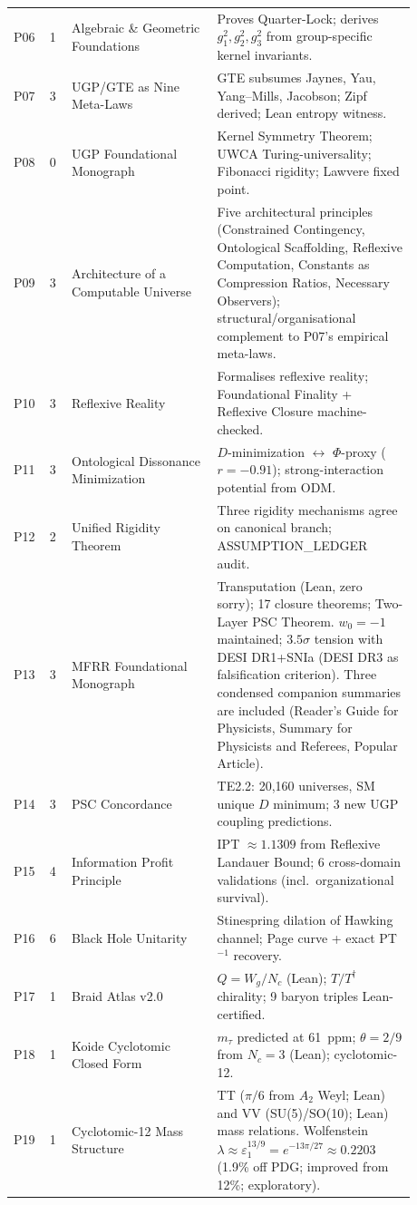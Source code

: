 \documentclass[11pt]{article}
\begin{document}
\begin{longtable}{@{}P{0.05\linewidth}P{0.05\linewidth}P{0.33\linewidth}P{0.45\linewidth}@{}}
P06 & 1 & Algebraic \& Geometric Foundations & Proves Quarter-Lock; derives $g_1^2,g_2^2,g_3^2$ from group-specific kernel invariants. \\
P07 & 3 & UGP/GTE as Nine Meta-Laws & GTE subsumes Jaynes, Yau, Yang--Mills, Jacobson; Zipf derived; Lean entropy witness. \\
P08 & 0 & UGP Foundational Monograph & Kernel Symmetry Theorem; UWCA Turing-universality; Fibonacci rigidity; Lawvere fixed point. \\
P09 & 3 & Architecture of a Computable Universe & Five architectural principles (Constrained Contingency, Ontological Scaffolding, Reflexive Computation, Constants as Compression Ratios, Necessary Observers); structural/organisational complement to P07's empirical meta-laws. \\
P10 & 3 & Reflexive Reality & Formalises reflexive reality; Foundational Finality + Reflexive Closure machine-checked. \\
P11 & 3 & Ontological Dissonance Minimization & $D$-minimization $\leftrightarrow$ $\Phi$-proxy ($r=-0.91$); strong-interaction potential from ODM. \\
P12 & 2 & Unified Rigidity Theorem & Three rigidity mechanisms agree on canonical branch; ASSUMPTION\_LEDGER audit. \\
P13 & 3 & MFRR Foundational Monograph & Transputation (Lean, zero sorry); 17 closure theorems; Two-Layer PSC Theorem.  $w_0 = -1$ maintained; $3.5\sigma$ tension with DESI DR1+SNIa (DESI DR3 as falsification criterion).  Three condensed companion summaries are included (Reader's Guide for Physicists, Summary for Physicists and Referees, Popular Article). \\
P14 & 3 & PSC Concordance & TE2.2: 20,160 universes, SM unique $D$ minimum; 3 new UGP coupling predictions. \\
P15 & 4 & Information Profit Principle & IPT $\approx 1.1309$ from Reflexive Landauer Bound; 6 cross-domain validations (incl.\ organizational survival). \\
P16 & 6 & Black Hole Unitarity & Stinespring dilation of Hawking channel; Page curve + exact PT$^{-1}$ recovery. \\
P17 & 1 & Braid Atlas v2.0 & $Q=W_g/N_c$ (Lean); $T/T^\dagger$ chirality; 9 baryon triples Lean-certified. \\
P18 & 1 & Koide Cyclotomic Closed Form & $m_\tau$ predicted at 61~ppm; $\theta=2/9$ from $N_c=3$ (Lean); cyclotomic-12. \\
P19 & 1 & Cyclotomic-12 Mass Structure & TT ($\pi/6$ from $A_2$ Weyl; Lean) and VV (SU(5)/SO(10); Lean) mass relations.  Wolfenstein $\lambda \approx \varepsilon_1^{13/9} = e^{-13\pi/27} \approx 0.2203$ (1.9\% off PDG; improved from 12\%; exploratory). \\

\end{longtable}
\end{document}
